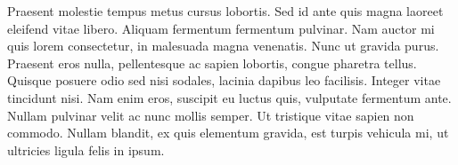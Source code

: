 \documentclass[a4paper,11pt]{report}
\begin{document}
\begin{multicols}{2}
  Praesent molestie tempus metus cursus lobortis. Sed id ante quis magna laoreet eleifend vitae libero.
  Aliquam fermentum fermentum pulvinar. Nam auctor mi quis lorem consectetur, in malesuada magna venenatis. Nunc ut gravida purus.
  Praesent eros nulla, pellentesque ac sapien lobortis, congue pharetra tellus. Quisque posuere odio sed nisi sodales,
  lacinia dapibus leo facilisis.
  Integer vitae tincidunt nisi. Nam enim eros, suscipit eu luctus quis, vulputate fermentum ante.
  Nullam pulvinar velit ac nunc mollis semper. Ut tristique vitae sapien non commodo. Nullam blandit, ex quis elementum gravida, est
  turpis vehicula mi, ut ultricies ligula felis in ipsum.
\end{multicols}
\end{document}
